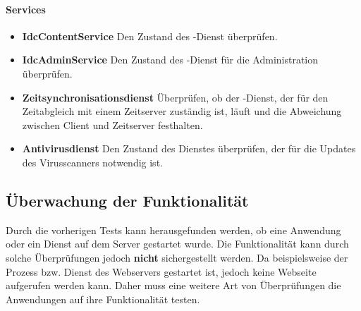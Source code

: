 \paragraph{Services}
\begin{itemize}
\item \textbf{IdcContentService}  Den Zustand des -Dienst überprüfen.
\item \textbf{IdcAdminService}  Den Zustand des -Dienst für die Administration überprüfen.
\item \textbf{Zeitsynchronisationsdienst} Überprüfen, ob der -Dienst, der für den Zeitabgleich mit einem Zeitserver zuständig ist, läuft und die Abweichung zwischen Client und Zeitserver festhalten.
\item \textbf{Antivirusdienst} Den Zustand des Dienstes  überprüfen, der für die Updates des Virusscanners notwendig ist.
\end{itemize}

\subsection{Überwachung der Funktionalität}
\label{funztest}
Durch die vorherigen Tests kann herausgefunden werden, ob eine Anwendung oder ein Dienst auf dem Server gestartet wurde.
Die Funktionalität kann durch solche Überprüfungen jedoch \textbf{nicht} sichergestellt werden.
Da beispielsweise der Prozess bzw. Dienst des Webservers gestartet ist, jedoch keine Webseite aufgerufen werden kann.
Daher muss eine weitere Art von Überprüfungen die Anwendungen auf ihre Funktionalität testen.

